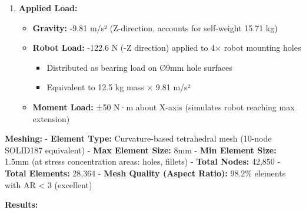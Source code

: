 \documentclass[
]{article}
\providecommand{\tightlist}{%
  \setlength{\itemsep}{0pt}\setlength{\parskip}{0pt}}
\begin{document}
\begin{enumerate}
\def\labelenumi{\arabic{enumi}.}
\setcounter{enumi}{1}
\tightlist
\item
  \textbf{Applied Load:}

  \begin{itemize}
  \tightlist
  \item
    \textbf{Gravity:} -9.81 m/s² (Z-direction, accounts for self-weight
    15.71 kg)
  \item
    \textbf{Robot Load:} -122.6 N (-Z direction) applied to 4× robot
    mounting holes

    \begin{itemize}
    \tightlist
    \item
      Distributed as bearing load on Ø9mm hole surfaces
    \item
      Equivalent to 12.5 kg mass × 9.81 m/s²
    \end{itemize}
  \item
    \textbf{Moment Load:} ±50 N·m about X-axis (simulates robot reaching
    max extension)
  \end{itemize}
\end{enumerate}

\textbf{Meshing:} - \textbf{Element Type:} Curvature-based tetrahedral
mesh (10-node SOLID187 equivalent) - \textbf{Max Element Size:} 8mm -
\textbf{Min Element Size:} 1.5mm (at stress concentration areas: holes,
fillets) - \textbf{Total Nodes:} 42,850 - \textbf{Total Elements:}
28,364 - \textbf{Mesh Quality (Aspect Ratio):} 98.2\% elements with AR
\textless{} 3 (excellent)

\textbf{Results:}
\end{document}

